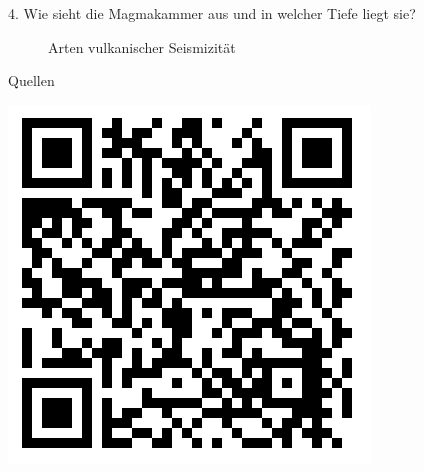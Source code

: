 \documentclass[xcolor=dvipsnames]{beamer}
\begin{document}
\begin{frame}[t]{}
\begin{block}{\LARGE 4. Wie sieht die Magmakammer aus und in welcher Tiefe liegt sie?}
\begin{minipage}{0.42\textwidth}
\begin{figure}
       \caption{\Large Arten vulkanischer Seismizität}
  \end{figure}
  \vskip -10mm
  \begin{block}{\LARGE Quellen}
	\begin{minipage}[h]{0.78\textwidth}
	\vskip 10mm
	\large

	\end{minipage}
	\hfill
	\begin{minipage}[h]{0.2\textwidth}
          \includegraphics[scale=0.6]{images/11.jpg}
	\end{minipage}
  \end{block}
  \end{minipage}
      
  \end{block}
\end{frame}
\end{document}
